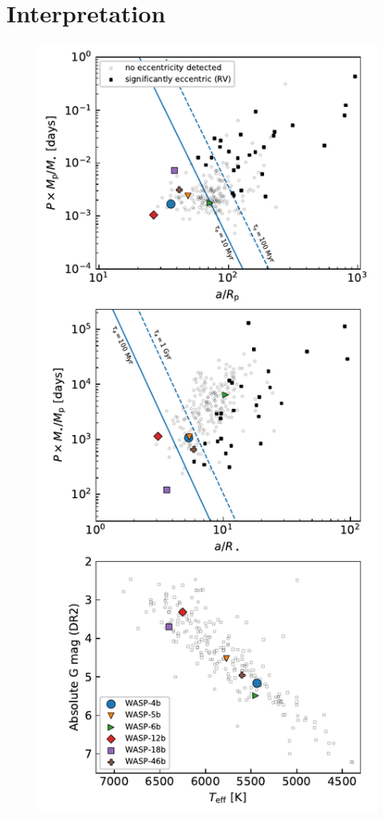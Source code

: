 \documentclass[12pt,twocolumn,tighten]{aastex62}
\begin{document}
\section{Interpretation}
\label{sec:implications}

\begin{figure}[t]
  \begin{center}
    \includegraphics[height=0.88\textheight]{f5.pdf}

\end{center}
\end{figure}
\end{document}
